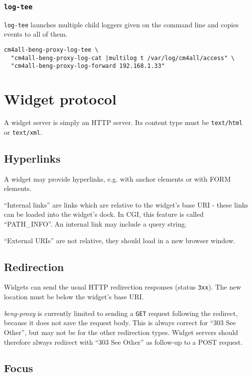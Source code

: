 \documentclass[a4paper,12pt]{article}
\begin{document}
\subsubsection{\texttt{log-tee}}

\texttt{log-tee} launches multiple child loggers given on the command
line and copies events to all of them.

\begin{verbatim}
cm4all-beng-proxy-log-tee \
  "cm4all-beng-proxy-log-cat |multilog t /var/log/cm4all/access" \
  "cm4all-beng-proxy-log-forward 192.168.1.33"
\end{verbatim}


\section{Widget protocol}

A widget server is simply an HTTP server.  Its content type must be
\texttt{text/html} or \texttt{text/xml}.


\subsection{Hyperlinks}

A widget may provide hyperlinks, e.g. with anchor elements or with
FORM elements.

``Internal links'' are links which are relative to the widget's base
URI - these links can be loaded into the widget's dock.  In CGI, this
feature is called ``PATH\_INFO''.  An internal link may include a
query string.

``External URIs'' are not relative, they should
load in a new browser window.

\subsection{Redirection}

Widgets can send the usual HTTP redirection responses (status
\texttt{3xx}).  The new location must be below the widget's base URI.

\emph{beng-proxy} is currently limited to sending a \texttt{GET}
request following the redirect, because it does not save the request
body.  This is always correct for ``303 See Other'', but may not be
for the other redirection types.  Widget servers should therefore
always redirect with ``303 See Other'' as follow-up to a POST request.

\subsection{Focus}
\label{focus}
\end{document}
